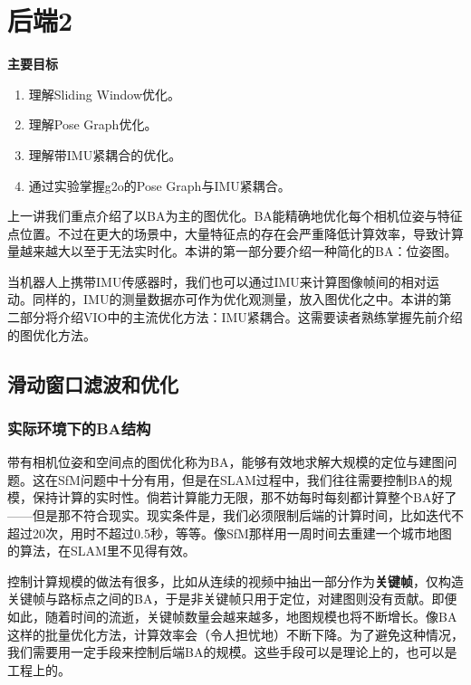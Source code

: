 \chapter{后端2}
\begin{mdframed}  
	\textbf{主要目标}
	\begin{enumerate}[labelindent=0em,leftmargin=1.5em]
		\item 理解Sliding Window优化。
		\item 理解Pose Graph优化。
		\item 理解带IMU紧耦合的优化。
		\item 通过实验掌握g2o的Pose Graph与IMU紧耦合。
	\end{enumerate}
\end{mdframed}

上一讲我们重点介绍了以BA为主的图优化。BA能精确地优化每个相机位姿与特征点位置。不过在更大的场景中，大量特征点的存在会严重降低计算效率，导致计算量越来越大以至于无法实时化。本讲的第一部分要介绍一种简化的BA：位姿图。

当机器人上携带IMU传感器时，我们也可以通过IMU来计算图像帧间的相对运动。同样的，IMU的测量数据亦可作为优化观测量，放入图优化之中。本讲的第二部分将介绍VIO中的主流优化方法：IMU紧耦合。这需要读者熟练掌握先前介绍的图优化方法。

\newpage
\section{滑动窗口滤波和优化}
\subsection{实际环境下的BA结构}
带有相机位姿和空间点的图优化称为BA，能够有效地求解大规模的定位与建图问题。这在SfM问题中十分有用，但是在SLAM过程中，我们往往需要控制BA的规模，保持计算的实时性。倘若计算能力无限，那不妨每时每刻都计算整个BA好了——但是那不符合现实。现实条件是，我们必须限制后端的计算时间，比如迭代不超过20次，用时不超过0.5秒，等等。像SfM那样用一周时间去重建一个城市地图的算法，在SLAM里不见得有效。

控制计算规模的做法有很多，比如从连续的视频中抽出一部分作为\textbf{关键帧}\textsuperscript{\cite{Leutenegger2015}}，仅构造关键帧与路标点之间的BA，于是非关键帧只用于定位，对建图则没有贡献。即便如此，随着时间的流逝，关键帧数量会越来越多，地图规模也将不断增长。像BA这样的批量优化方法，计算效率会（令人担忧地）不断下降。为了避免这种情况，我们需要用一定手段来控制后端BA的规模。这些手段可以是理论上的，也可以是工程上的。

